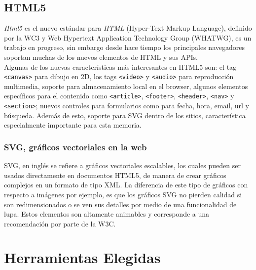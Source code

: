 \subsection{HTML5} %
\label{sub:html5}

\emph{Html5}\cite{html5} es el nuevo estándar para \emph{HTML} (Hyper-Text Markup Language), definido por la WC3\cite{w3c} y Web Hypertext Application Technology Group (WHATWG), es un trabajo en progreso, sin embargo desde hace tiempo los principales navegadores soportan muchas de los nuevos elementos de HTML y sus APIs.\\

Algunas de los nuevas características más interesantes en HTML5 son: el tag \texttt{<canvas>} para dibujo en 2D, los tags \texttt{<video>} y \texttt{<audio>} para reproducción multimedia, soporte para almacenamiento local en el browser, algunos elementos específicos para el contenido como \texttt{<article>}, \texttt{<footer>}, \texttt{<header>}, \texttt{<nav>} y \texttt{<section>}; nuevos controles para formularios como para fecha, hora, email, url y búsqueda. Además de esto, soporte para SVG dentro de los sitios, característica especialmente importante para esta memoria.

\subsubsection{SVG, gráficos vectoriales en la web} %
\label{ssub:svg_graficos_vectoriales_en_la_web}

SVG, en inglés se refiere a gráficos vectoriales escalables, los cuales pueden ser usados directamente en documentos HTML5, de manera de crear gráficos complejos en un formato de tipo XML. La diferencia de este tipo de gráficos con respecto a imágenes por ejemplo, es que los gráficos SVG no pierden calidad si son redimensionados o se ven sus detalles por medio de una funcionalidad de lupa. Estos elementos son altamente animables y corresponde a una recomendación por parte de la W3C\cite{w3c}.




\section{Herramientas Elegidas} %
\label{sec:herramientas_elegidas}

